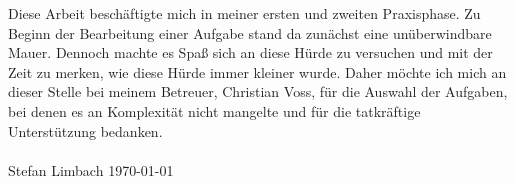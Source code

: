 Diese Arbeit beschäftigte mich in meiner ersten und zweiten Praxisphase. Zu Beginn der Bearbeitung einer Aufgabe stand da zunächst eine unüberwindbare Mauer. Dennoch machte es Spaß sich an diese Hürde zu versuchen und mit der Zeit zu merken, wie diese Hürde immer kleiner wurde. Daher möchte ich mich an dieser Stelle bei meinem Betreuer, Christian Voss, für die Auswahl der Aufgaben, bei denen es an Komplexität nicht mangelte und für die tatkräftige Unterstützung bedanken.
\\\\
Stefan Limbach \today   